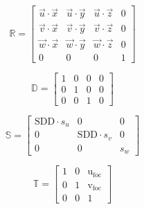 \documentclass[10pt, a4paper, fleqn]{scrartcl}
\begin{document}
\begin{equation*}
\mathds{R}=\begin{bmatrix}
\vec{u} \cdot \vec{x} & \vec{u} \cdot \vec{y} & \vec{u} \cdot \vec{z} & 0\\
\vec{v} \cdot \vec{x} & \vec{v} \cdot \vec{y} & \vec{v} \cdot \vec{z} & 0\\
\vec{w} \cdot \vec{x} & \vec{w} \cdot \vec{y} & \vec{w} \cdot \vec{z} & 0\\
0 & 0 & 0 & 1
\end{bmatrix}
\end{equation*}

\begin{equation*}
\mathds{D}=\begin{bmatrix}
1 & 0 & 0 & 0 \\
0 & 1 & 0 & 0 \\
0 & 0 & 1 & 0
\end{bmatrix}
\end{equation*}

\begin{equation*}
\mathds{S}=\begin{bmatrix}
\text{SDD}\cdot s_u & 0 & 0 \\
0 & \text{SDD}\cdot s_v & 0 \\
0 & 0 & s_w
\end{bmatrix}
\end{equation*}

\begin{equation*}
\mathds{T}=\begin{bmatrix}
1 & 0 & \text{u}_\text{foc} \\
0 & 1 & \text{v}_\text{foc} \\
0 & 0 & 1
\end{bmatrix}
\end{equation*}
\end{document}
